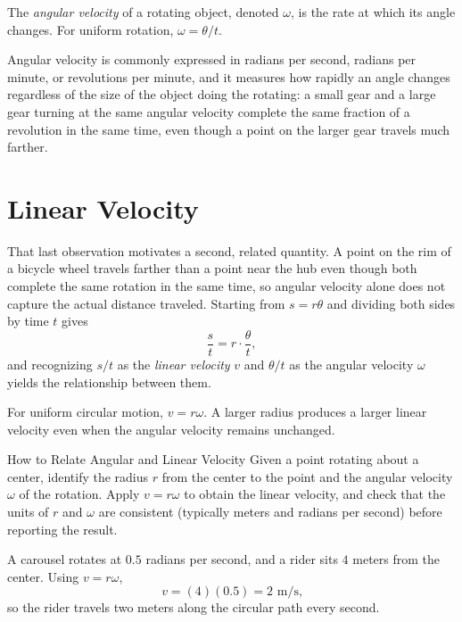 \begin{definition}
The \emph{angular velocity} of a rotating object, denoted $\omega$, is the
rate at which its angle changes. For uniform rotation, $\omega = \theta/t$.
\end{definition}

Angular velocity is commonly expressed in radians per second, radians per
minute, or revolutions per minute, and it measures how rapidly an angle
changes regardless of the size of the object doing the rotating: a small
gear and a large gear turning at the same angular velocity complete the
same fraction of a revolution in the same time, even though a point on the
larger gear travels much farther.

\section{Linear Velocity}

That last observation motivates a second, related quantity. A point on the
rim of a bicycle wheel travels farther than a point near the hub even
though both complete the same rotation in the same time, so angular
velocity alone does not capture the actual distance traveled. Starting from
$s = r\theta$ and dividing both sides by time $t$ gives
\[
\frac{s}{t} = r\cdot\frac{\theta}{t},
\]
and recognizing $s/t$ as the \emph{linear velocity} $v$ and $\theta/t$ as
the angular velocity $\omega$ yields the relationship between them.

\begin{theorem}
For uniform circular motion, $v = r\omega$. A larger radius produces a
larger linear velocity even when the angular velocity remains unchanged.
\end{theorem}

\begin{algorithmproc}{How to Relate Angular and Linear Velocity}
Given a point rotating about a center, identify the radius $r$ from the
center to the point and the angular velocity $\omega$ of the rotation.
Apply $v = r\omega$ to obtain the linear velocity, and check that the units
of $r$ and $\omega$ are consistent (typically meters and radians per
second) before reporting the result.
\end{algorithmproc}

\begin{example}
A carousel rotates at $0.5$ radians per second, and a rider sits $4$ meters
from the center. Using $v = r\omega$,
\[
v = (4)(0.5) = 2 \text{ m/s,}
\]
so the rider travels two meters along the circular path every second.
\end{example}

